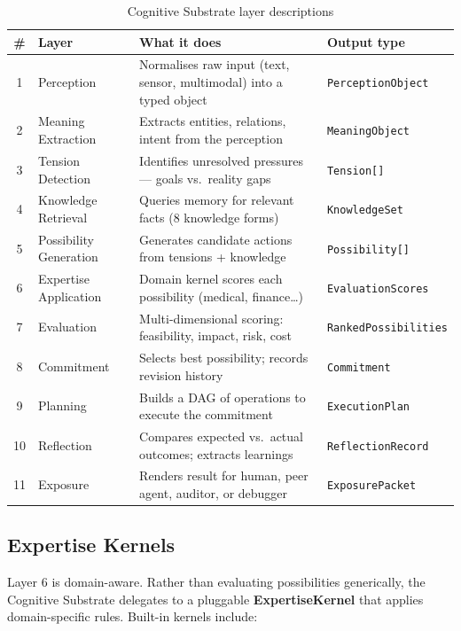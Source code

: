 \begin{table}[H]
\centering
\renewcommand{\arraystretch}{1.35}
\begin{tabularx}{\textwidth}{@{}clXl@{}}
\toprule
\textbf{\#} & \textbf{Layer} & \textbf{What it does} & \textbf{Output type} \\
\midrule
1  & Perception           & Normalises raw input (text, sensor, multimodal) into a typed object & \texttt{PerceptionObject} \\
2  & Meaning Extraction   & Extracts entities, relations, intent from the perception & \texttt{MeaningObject} \\
3  & Tension Detection    & Identifies unresolved pressures — goals vs.\ reality gaps & \texttt{Tension[]} \\
4  & Knowledge Retrieval  & Queries memory for relevant facts (8 knowledge forms) & \texttt{KnowledgeSet} \\
5  & Possibility Generation & Generates candidate actions from tensions + knowledge & \texttt{Possibility[]} \\
6  & Expertise Application & Domain kernel scores each possibility (medical, finance…) & \texttt{EvaluationScores} \\
7  & Evaluation           & Multi-dimensional scoring: feasibility, impact, risk, cost & \texttt{RankedPossibilities} \\
8  & Commitment           & Selects best possibility; records revision history & \texttt{Commitment} \\
9  & Planning             & Builds a DAG of operations to execute the commitment & \texttt{ExecutionPlan} \\
10 & Reflection           & Compares expected vs.\ actual outcomes; extracts learnings & \texttt{ReflectionRecord} \\
11 & Exposure             & Renders result for human, peer agent, auditor, or debugger & \texttt{ExposurePacket} \\
\bottomrule
\end{tabularx}
\caption{Cognitive Substrate layer descriptions}
\end{table}

\subsection{Expertise Kernels}

Layer 6 is domain-aware. Rather than evaluating possibilities generically, the
Cognitive Substrate delegates to a pluggable \textbf{ExpertiseKernel} that
applies domain-specific rules. Built-in kernels include:

